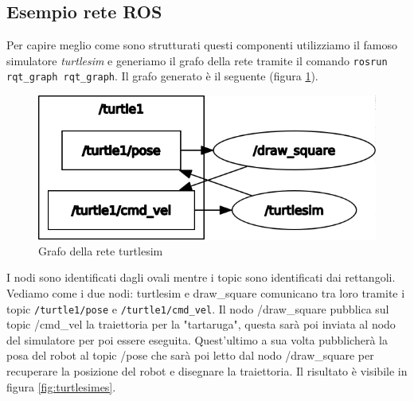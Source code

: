 \subsection{Esempio rete ROS}
\label{subsec:esempio_rete_ros}
Per capire meglio come sono strutturati questi componenti utilizziamo il famoso simulatore \textit{turtlesim} e generiamo il grafo della rete tramite il comando \verb+rosrun rqt_graph rqt_graph+. Il grafo generato è il seguente (figura \ref{fig:turtlesim}).
\begin{figure}[h!]
    \centering
    \includegraphics[scale=0.5]{images/turtlesim.png}
    \caption{Grafo della rete turtlesim}
    \label{fig:turtlesim}
\end{figure}
I nodi sono identificati dagli ovali mentre i topic sono identificati dai rettangoli. Vediamo come i due nodi: turtlesim e draw\_square comunicano tra loro tramite i topic \verb+/turtle1/pose+ e \verb+/turtle1/cmd_vel+. Il nodo /draw\_square pubblica sul topic /cmd\_vel la traiettoria per la "tartaruga", questa sarà poi inviata al nodo del simulatore per poi essere eseguita. Quest'ultimo a sua volta pubblicherà la posa del robot al topic /pose che sarà poi letto dal nodo /draw\_square per recuperare la posizione del robot e disegnare la traiettoria.
Il risultato è visibile in figura \ref{fig:turtlesimes}.
